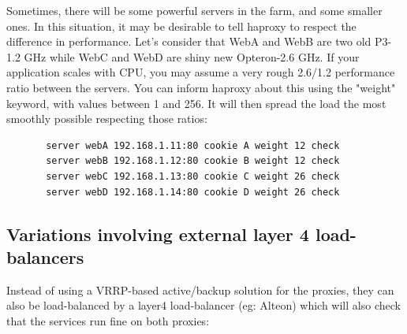 Sometimes, there will be some powerful servers in the farm, and some smaller
ones. In this situation, it may be desirable to tell haproxy to respect the
difference in performance. Let's consider that WebA and WebB are two old
P3-1.2 GHz while WebC and WebD are shiny new Opteron-2.6 GHz. If your
application scales with CPU, you may assume a very rough 2.6/1.2 performance
ratio between the servers. You can inform haproxy about this using the "weight"
keyword, with values between 1 and 256. It will then spread the load the most
smoothly possible respecting those ratios:

\begin{verbatim}
       server webA 192.168.1.11:80 cookie A weight 12 check
       server webB 192.168.1.12:80 cookie B weight 12 check
       server webC 192.168.1.13:80 cookie C weight 26 check
       server webD 192.168.1.14:80 cookie D weight 26 check
\end{verbatim}

\subsection{Variations involving external layer 4 load-balancers}

Instead of using a VRRP-based active/backup solution for the proxies,
they can also be load-balanced by a layer4 load-balancer (eg: Alteon)
which will also check that the services run fine on both proxies:

